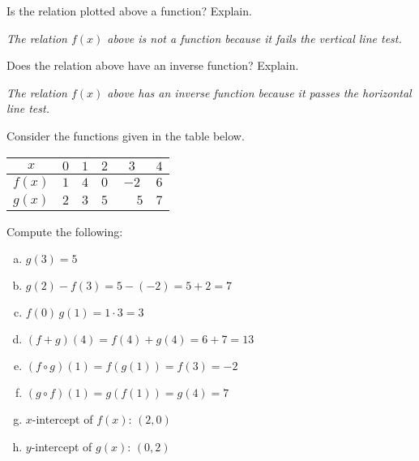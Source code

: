 \documentclass[12pt,letterpaper]{exam}
\begin{document}
\begin{questions}
\begin{parts}
\item Is the relation plotted above a function? Explain. \pvspace{1cm}

{\itshape The relation $f(x)$ above is not a function because it fails the vertical line test.} \pvspace{2.4cm}

\item Does the relation above have an inverse function? Explain. \pvspace{1cm}

{\itshape The relation $f(x)$ above has an inverse function because it passes the horizontal line test.}
\end{parts}



\newpage



\question[10] Consider the functions given in the table below.
        \begin{table}[!ht]
        \centering
        \begin{tabular}{| c || c | c | c | c | c |} \hline
	$x$ & $0$ & $1$ & $2$ & $3$ & $4$ \\ \hline
	$f(x)$ & $1$ & $4$ & $0$ & $-2$ & $6$ \\ \hline
	$g(x)$ & $2$ & $3$ & $5$ & $\phantom{-}5$ & $7$ \\ \hline
        \end{tabular}
        \end{table}

Compute the following: \pspace
        \begin{enumerate}[(a)]
        \item $g(3)= 5$ \vfill
        \item $g(2) - f(3)= 5 - (-2)= 5 + 2= 7$ \vfill
        \item $f(0)\,g(1)= 1 \cdot 3= 3$ \vfill
        \item $(f + g)(4)= f(4) + g(4)= 6 + 7= 13$ \vfill
        \item $(f \circ g)(1)= f(g(1))= f(3)= -2$ \vfill
        \item $(g \circ f)(1)= g(f(1))= g(4)= 7$ \vfill
        \item $x$-intercept of $f(x)$: $(2, 0)$ \vfill
        \item $y$-intercept of $g(x)$: $(0, 2)$ \vfill
        \end{enumerate}



\newpage




\end{questions}
\end{document}
